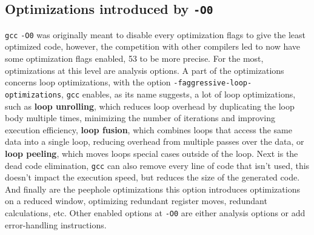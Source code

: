 \documentclass{rapport}
\newcommand{\gcc}{\texttt{gcc} }
\newcommand{\optizero}{\texttt{-O0} }
\begin{document}
\subsection*{Optimizations introduced by \optizero}
\gcc \optizero was originally meant to disable every optimization flags to give the least optimized code, however, the competition with other compilers led to 
now have some optimization flags enabled, 53 to be more precise. For the most, optimizations at this level are analysis options.
\newline\newline
A part of the optimizations concerns loop optimizations, with the option \newline \texttt{-faggressive-loop-optimizations}, \gcc enables, as its name suggests, a lot of loop optimizations, 
such as \textbf{loop unrolling}, which reduces loop overhead by duplicating the loop body multiple times, minimizing the number of iterations and improving execution efficiency, 
\textbf{loop fusion}, which combines loops that access the same data into a single loop, reducing overhead from multiple passes over the data, or \textbf{loop peeling}, which moves loops
special cases outside of the loop. \newline\newline
Next is the dead code elimination, \gcc can also remove every line of code that isn't used, this doesn't impact the execution speed, but reduces the size of the generated code.\newline
And finally are the peephole optimizations this option introduces optimizations on a reduced window, optimizing redundant register moves, redundant calculations, etc.
\newline
Other enabled options at \optizero are either analysis options or add error-handling instructions.
\end{document}
